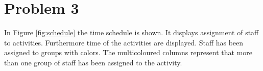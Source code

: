 \chapter{Problem 3}

In Figure \ref{fig:schedule} the time schedule is shown. It displays assignment of staff to activities. Furthermore time of the activities are displayed.
Staff has been assigned to groups with colors.
The multicoloured columns represent that more than one group of staff has been assigned to the activity.
